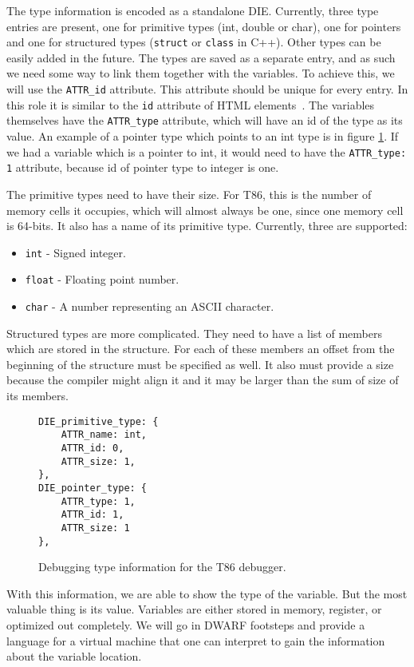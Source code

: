 The type information is encoded as a standalone DIE. Currently, three type
entries are present, one for primitive types (int, double or char), one for
pointers and one for structured types (\texttt{struct} or \texttt{class} in
C++). Other types can be easily added in the future. The types are saved as a
separate entry, and as such we need some way to link them together with the
variables. To achieve this, we will use the \verb|ATTR_id| attribute. This
attribute should be unique for every entry. In this role it is similar to the
\texttt{id} attribute of HTML elements~\cite{html4}. The variables themselves
have the \verb|ATTR_type| attribute, which will have an id of the type as its
value. An example of a pointer type which points to an int type is in figure
\ref{fig:t86dbg-types}. If we had a variable which is a pointer to int, it
would need to have the \verb|ATTR_type: 1| attribute, because id of pointer
type to integer is one.

The primitive types need to have their size. For T86, this is the number of
memory cells it occupies, which will almost always be one, since one memory
cell is 64-bits. It also has a name of its primitive type. Currently, three are
supported:
\begin{itemize}
    \item \texttt{int} - Signed integer.
    \item \texttt{float} - Floating point number.
    \item \texttt{char} - A number representing an ASCII character.
\end{itemize}

Structured types are more complicated. They need to have a list of members
which are stored in the structure. For each of these members an offset
from the beginning of the structure must be specified as well. It also must
provide a size because the compiler might align it and it may be larger
than the sum of size of its members.

\begin{figure}
    \begin{lstlisting}
DIE_primitive_type: {
    ATTR_name: int,
    ATTR_id: 0,
    ATTR_size: 1,
},
DIE_pointer_type: {
    ATTR_type: 1,
    ATTR_id: 1,
    ATTR_size: 1
},
    \end{lstlisting}
    \caption{Debugging type information for the T86 debugger.}
    \label{fig:t86dbg-types}
\end{figure}

With this information, we are able to show the type of the variable.
But the most valuable thing is its value. Variables are either stored in
memory, register, or optimized out completely. We will go in DWARF footsteps
and provide a language for a virtual machine that one can interpret to gain the
information about the variable location.

